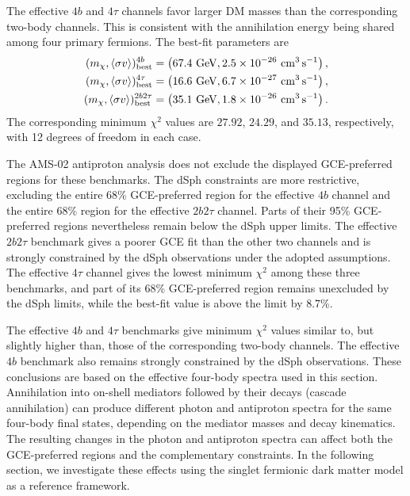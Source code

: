\documentclass[superscriptaddress,
showpacs,preprintnumbers,nofootinbib,eqsecnum,amsmath,amssymb,aps,11pt, groupedaddress, floatfix]{revtex4-2}
\begin{document}
The effective $4b$ and $4\tau$ channels favor larger DM masses
than the corresponding two-body channels.
This is consistent with the annihilation energy being shared
among four primary fermions.
The best-fit parameters are
\begin{align}
(m_\chi,\langle\sigma v\rangle)_{\rm best}^{4b}
&=
\left(
67.4~\mathrm{GeV},
2.5\times10^{-26}~\mathrm{cm^3\,s^{-1}}
\right), \\
(m_\chi,\langle\sigma v\rangle)_{\rm best}^{4\tau}
&=
\left(
16.6~\mathrm{GeV},
6.7\times10^{-27}~\mathrm{cm^3\,s^{-1}}
\right), \\
(m_\chi,\langle\sigma v\rangle)_{\rm best}^{2b2\tau}
&=
\left(
35.1~\mathrm{GeV},
1.8\times10^{-26}~\mathrm{cm^3\,s^{-1}}
\right).
\end{align}
The corresponding minimum $\chi^2$ values are
$27.92$, $24.29$, and $35.13$, respectively,
with 12 degrees of freedom in each case.

The AMS-02 antiproton analysis does not exclude the displayed GCE-preferred regions for these benchmarks.
The dSph constraints are more restrictive, excluding the entire 68\% GCE-preferred region for the effective $4b$ channel and the entire 68\% region for the effective
$2b2\tau$ channel.
Parts of their 95\% GCE-preferred regions nevertheless remain below the dSph upper limits.
The effective $2b2\tau$ benchmark gives a poorer GCE fit than the other two channels and is strongly constrained by the dSph observations under the adopted assumptions.
The effective $4\tau$ channel gives the lowest minimum $\chi^2$ among these three benchmarks, and part of its 68\% GCE-preferred region remains unexcluded by the dSph limits, while the best-fit value is above the limit by 8.7\%.

The effective $4b$ and $4\tau$ benchmarks give minimum $\chi^2$ values similar to, but slightly higher than, those of the corresponding two-body channels.
The effective $4b$ benchmark also remains strongly constrained by the dSph observations.
These conclusions are based on the effective four-body spectra used in this section.
Annihilation into on-shell mediators followed by their decays (cascade annihilation) can produce different photon and antiproton spectra for the same four-body final states,
depending on the mediator masses and decay kinematics.
The resulting changes in the photon and antiproton spectra can affect both the GCE-preferred regions and the complementary constraints.
In the following section, we investigate these effects using
the singlet fermionic dark matter model as a reference framework.
\end{document}
